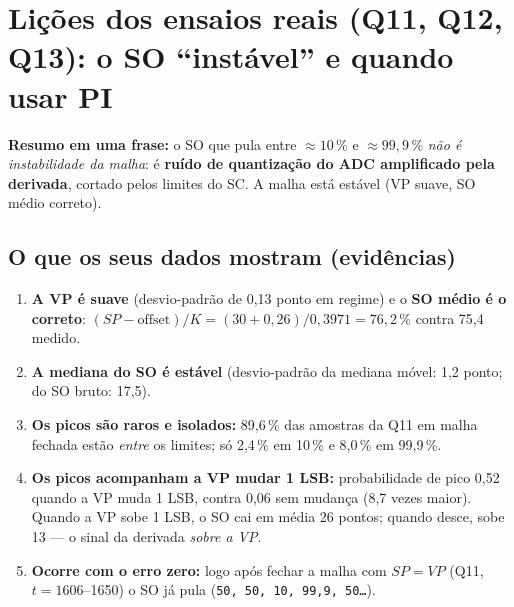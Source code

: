 \documentclass[11pt,a4paper]{article}
\begin{document}
\section{Lições dos ensaios reais (Q11, Q12, Q13): o SO ``instável'' e quando usar PI}\label{licoes}
\textbf{Resumo em uma frase:} o SO que pula entre $\approx10\,\%$ e $\approx99{,}9\,\%$ \emph{não é instabilidade da malha}: é \textbf{ruído de quantização do ADC amplificado pela derivada}, cortado pelos limites do SC. A malha está estável (VP suave, SO médio correto).

\subsection{O que os seus dados mostram (evidências)}
\begin{enumerate}
\item \textbf{A VP é suave} (desvio-padrão de 0,13 ponto em regime) e o \textbf{SO médio é o correto}: $(SP-\text{offset})/K=(30+0{,}26)/0{,}3971=76{,}2\,\%$ contra 75,4 medido.
\item \textbf{A mediana do SO é estável} (desvio-padrão da mediana móvel: 1,2 ponto; do SO bruto: 17,5).
\item \textbf{Os picos são raros e isolados:} 89,6\,\% das amostras da Q11 em malha fechada estão \emph{entre} os limites; só 2,4\,\% em 10\,\% e 8,0\,\% em 99,9\,\%.
\item \textbf{Os picos acompanham a VP mudar 1 LSB:} probabilidade de pico 0,52 quando a VP muda 1 LSB, contra 0,06 sem mudança (8,7 vezes maior). Quando a VP sobe 1 LSB, o SO cai em média 26 pontos; quando desce, sobe 13 --- o sinal da derivada \emph{sobre a VP}.
\item \textbf{Ocorre com o erro zero:} logo após fechar a malha com $SP=VP$ (Q11, $t=1606$--1650) o SO já pula (\texttt{50, 50, 10, 99,9, 50\ldots}).
\end{enumerate}
\end{document}
